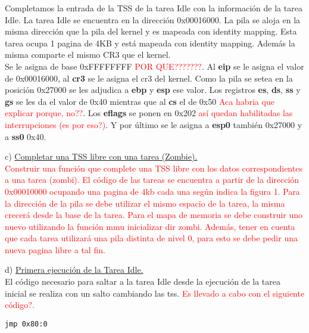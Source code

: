 \documentclass[a4paper]{article}
\begin{document}
Completamos la entrada de la TSS de la tarea Idle con la informaci\'on de la tarea Idle. La tarea Idle se encuentra en la direcci\'on 0x00016000. La pila se aloja en la misma direcci\'on que la pila del kernel y es mapeada con identity mapping. Esta tarea ocupa 1 pagina de 4KB y est\'a mapeada con identity mapping. Adem\'as la misma comparte el mismo CR3 que el kernel. \\

Se le asigna de base 0xFFFFFFFF \textcolor{red}{POR QUE???????}. Al \textbf{eip} se le asigna el valor de 0x00016000, al \textbf{cr3} se le asigna el cr3 del kernel. Como la pila se setea en la posici\'on 0x27000 se les adjudica a \textbf{ebp} y \textbf{esp} ese valor. Los registros \textbf{es}, \textbf{ds}, \textbf{ss} y \textbf{gs} se les da el valor de 0x40 mientras que al \textbf{cs} el de 0x50 \textcolor{red}{Aca habria que explicar porque, no??}. Los \textbf{eflags} se ponen en 0x202 \textcolor{red}{as\'i quedan habilitadas las interrupciones (es por eso?)}. Y por \'ultimo se le asigna a \textbf{esp0} tambi\'en 0x27000 y a \textbf{ss0} 0x40.\\
\bigskip

{\large c)} \underline{Completar una TSS libre con una tarea (Zombie).}\\

\textcolor{red}{Construir una funci\'on que complete una TSS libre con los datos correspondientes a una
tarea (zombi). El c\'odigo de las tareas se encuentra a partir de la direcci\'on 0x00010000
ocupando una pagina de 4kb cada una seg\'un indica la figura 1. Para la direcci\'on de la
pila se debe utilizar el mismo espacio de la tarea, la misma crecer\'a desde la base de la tarea. 
Para el mapa de memoria se debe construir uno nuevo utilizando la funci\'on mmu inicializar dir zombi. 
Adem\'as, tener en cuenta que cada tarea utilizar\'a una pila distinta de nivel 0, para esto se debe pedir una nueva pagina libre a tal fin.} \\
\bigskip


{\large d)} \underline{Primera ejecuci\'on de la Tarea Idle.}\\

El c\'odigo necesario para saltar a la tarea Idle desde la ejecuci\'on de la tarea inicial se realiza con un salto cambiando las tss. \textcolor{red}{Es llevado a cabo con el siguiente c\'odigo?.}\\

\begin{codesnippet}
\begin{verbatim}
jmp 0x80:0
\end{verbatim}
\end{codesnippet}
\end{document}
